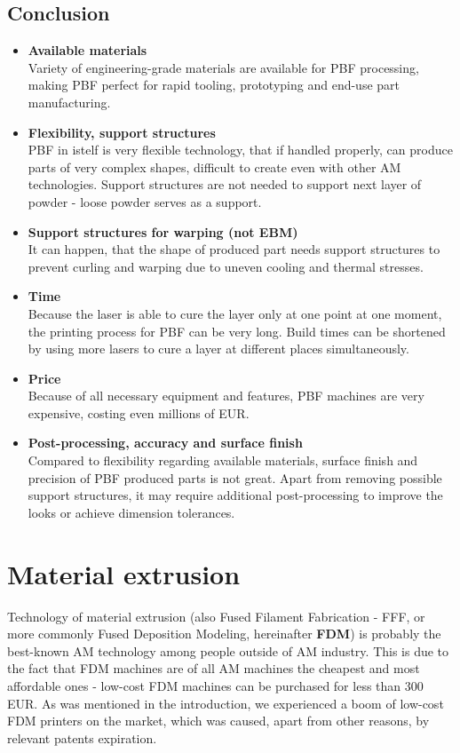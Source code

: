 \documentclass[a4paper, twoside, 11pt]{report}
\newcommand\pro{\item[$+$]}
\newcommand\con{\item[$-$]}
\begin{document}
\section{Conclusion}
\begin{itemize}
\pro \textbf{Available materials}\\
Variety of engineering-grade materials are available for PBF processing, making PBF perfect for rapid tooling, prototyping and end-use part manufacturing.

\pro \textbf{Flexibility, support structures}\\
PBF in istelf is very flexible technology, that if handled properly, can produce parts of very complex shapes, difficult to create even with other AM technologies. Support structures are not needed to support next layer of powder - loose powder serves as a support.
\\[10pt]

\con \textbf{Support structures for warping (not EBM)}\\
It can happen, that the shape of produced part needs support structures to prevent curling and warping due to uneven cooling and thermal stresses.

\con \textbf{Time}\\
Because the laser is able to cure the layer only at one point at one moment, the printing process for PBF can be very long. Build times can be shortened by using more lasers to cure a layer at different places simultaneously.

\con \textbf{Price}\\
Because of all necessary equipment and features, PBF machines are very expensive, costing even millions of EUR.

\con \textbf{Post-processing, accuracy and surface finish}\\
Compared to flexibility regarding available materials, surface finish and precision of PBF produced parts is not great. Apart from removing possible support structures, it may require additional post-processing to improve the looks or achieve dimension tolerances.
\end{itemize}




\chapter{Material extrusion}
Technology of material extrusion (also Fused Filament Fabrication - FFF, or more commonly Fused Deposition Modeling, hereinafter \textbf{FDM}) is probably the best-known AM technology among people outside of AM industry. This is due to the fact that FDM machines are of all AM machines the cheapest and most affordable ones - low-cost FDM machines can be purchased for less than 300 EUR. As was mentioned in the introduction, we experienced a boom of low-cost FDM printers on the market, which was caused, apart from other reasons, by relevant patents expiration.
\end{document}
